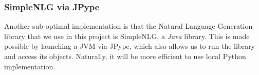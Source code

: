 \subsubsection{SimpleNLG via JPype}

Another sub-optimal implementation is that the Natural Language Generation library that we use in this project is SimpleNLG, a \textit{Java} library. This is made possible by launching a JVM via JPype, which also allows us to run the library and access its objects. Naturally, it will be more efficient to use local Python implementation.



